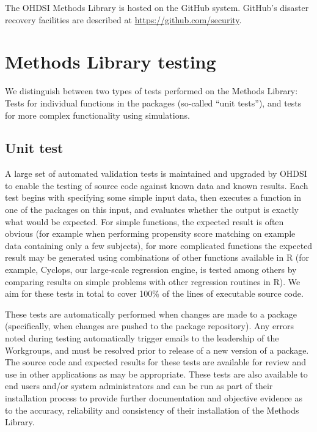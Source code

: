 \documentclass[11pt]{book}
\theoremstyle{definition}
\theoremstyle{definition}
\theoremstyle{definition}
\theoremstyle{remark}
\begin{document}
The OHDSI Methods Library is hosted on the GitHub system. GitHub's disaster recovery facilities are described at \url{https://github.com/security}.

\hypertarget{methods-library-testing}{%
\section{Methods Library testing}\label{methods-library-testing}}

We distinguish between two types of tests performed on the Methods Library: Tests for individual functions in the packages (so-called ``unit tests''), and tests for more complex functionality using simulations.

\hypertarget{unit-test}{%
\subsection{Unit test}\label{unit-test}}

A large set of automated validation tests is maintained and upgraded by OHDSI to enable the testing of source code against known data and known results. Each test begins with specifying some simple input data, then executes a function in one of the packages on this input, and evaluates whether the output is exactly what would be expected. For simple functions, the expected result is often obvious (for example when performing propensity score matching on example data containing only a few subjects), for more complicated functions the expected result may be generated using combinations of other functions available in R (for example, Cyclops, our large-scale regression engine, is tested among others by comparing results on simple problems with other regression routines in R). We aim for these tests in total to cover 100\% of the lines of executable source code.

These tests are automatically performed when changes are made to a package (specifically, when changes are pushed to the package repository). Any errors noted during testing automatically trigger emails to the leadership of the Workgroups, and must be resolved prior to release of a new version of a package. The source code and expected results for these tests are available for review and use in other applications as may be appropriate. These tests are also available to end users and/or system administrators and can be run as part of their installation process to provide further documentation and objective evidence as to the accuracy, reliability and consistency of their installation of the Methods Library.
\end{document}
